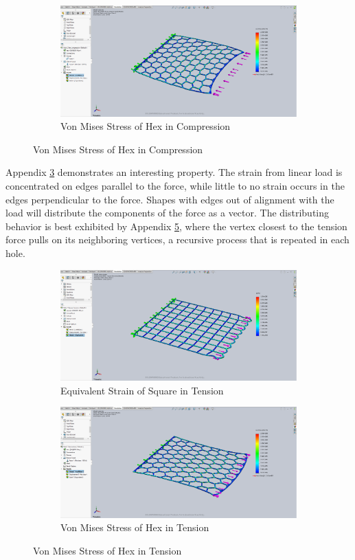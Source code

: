 \documentclass[12pt, letterpaper]{article}
\begin{document}
\begin{figure}[H]
\begin{subfigure}[b]{0.8\linewidth}
		\includegraphics[width=0.8\linewidth]{./graphs/compression/hex-compression-stress}
		\caption{Von Mises Stress of Hex in Compression}
		\label{fig:h-c-vm}
	\end{subfigure}
\end{figure}

Appendix \ref{fig:s-te-es} demonstrates an interesting property. The strain from linear load is concentrated on edges parallel to the force, while little to no strain occurs in the edges perpendicular to the force. Shapes with edges out of alignment with the load will distribute the components of the force as a vector. The distributing behavior is best exhibited by Appendix \ref{fig:h-te-vm}, where the vertex closest to the tension force pulls on its neighboring vertices, a recursive process that is repeated in each hole. 

\begin{figure}[H]
	\centering
	\caption{Graphs}
	\label{fig:imgs2}
	\begin{subfigure}[b]{0.8\linewidth}
		\includegraphics[width=0.8\linewidth]{./graphs/tension/square-tension-strain}
		\caption{Equivalent Strain of Square in Tension}
		\label{fig:s-te-es}
	\end{subfigure}
	\begin{subfigure}[b]{0.8\linewidth}
		\includegraphics[width=0.8\linewidth]{./graphs/tension/hex-tension-stress}
		\caption{Von Mises Stress of Hex in Tension}
		\label{fig:h-te-vm}
	\end{subfigure}
\end{figure}
\end{document}
